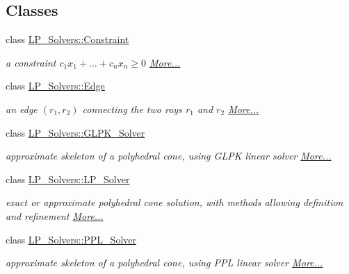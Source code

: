 \subsection*{Classes}
\begin{DoxyCompactItemize}
\item 
class \hyperlink{group___c_l_s_solvers_class_l_p___solvers_1_1_constraint}{L\+P\+\_\+\+Solvers\+::\+Constraint}
\begin{DoxyCompactList}\small\item\em a constraint $ c_1 x_1 + \ldots + c_n x_n \geq 0 $  \hyperlink{group___c_l_s_solvers_class_l_p___solvers_1_1_constraint}{More...}\end{DoxyCompactList}\item 
class \hyperlink{group___c_l_s_solvers_class_l_p___solvers_1_1_edge}{L\+P\+\_\+\+Solvers\+::\+Edge}
\begin{DoxyCompactList}\small\item\em an edge $(r_1,r_2)$ connecting the two rays $ r_1 $ and $ r_2 $  \hyperlink{group___c_l_s_solvers_class_l_p___solvers_1_1_edge}{More...}\end{DoxyCompactList}\item 
class \hyperlink{group___c_l_s_solvers_class_l_p___solvers_1_1_g_l_p_k___solver}{L\+P\+\_\+\+Solvers\+::\+G\+L\+P\+K\+\_\+\+Solver}
\begin{DoxyCompactList}\small\item\em approximate skeleton of a polyhedral cone, using G\+L\+PK linear solver  \hyperlink{group___c_l_s_solvers_class_l_p___solvers_1_1_g_l_p_k___solver}{More...}\end{DoxyCompactList}\item 
class \hyperlink{group___c_l_s_solvers_class_l_p___solvers_1_1_l_p___solver}{L\+P\+\_\+\+Solvers\+::\+L\+P\+\_\+\+Solver}
\begin{DoxyCompactList}\small\item\em exact or approximate polyhedral cone solution, with methods allowing definition and refinement  \hyperlink{group___c_l_s_solvers_class_l_p___solvers_1_1_l_p___solver}{More...}\end{DoxyCompactList}\item 
class \hyperlink{group___c_l_s_solvers_class_l_p___solvers_1_1_p_p_l___solver}{L\+P\+\_\+\+Solvers\+::\+P\+P\+L\+\_\+\+Solver}
\begin{DoxyCompactList}\small\item\em approximate skeleton of a polyhedral cone, using P\+PL linear solver  \hyperlink{group___c_l_s_solvers_class_l_p___solvers_1_1_p_p_l___solver}{More...}\end{DoxyCompactList}\item 

\end{DoxyCompactItemize}
